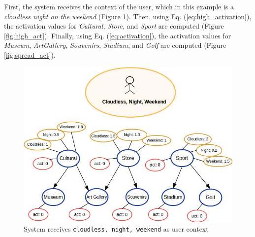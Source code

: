 \vspace{-0.2cm}
First, the system receives the context of the user, which in this example is a {\it cloudless night on the weekend} (Figure \ref{fig:init_act}). Then, using Eq. (\ref{eq:high_activation}), the activation values for \textit{Cultural}, \textit{Store}, and \textit{Sport} are computed (Figure \ref{fig:high_act}). Finally, using Eq. (\ref{eq:activation}), the activation values for \textit{Museum}, \textit{ArtGallery}, \textit{Souvenirs}, \textit{Stadium}, and \textit{Golf} are computed (Figure \ref{fig:spread_act}).

\begin{figure}[h]
\vspace{-0.3cm}
\centering
\includegraphics[scale=0.39]{draws/initial_act.jpg}
\vspace{-0.3cm}
\caption{System receives {\tt cloudless, night, weekend} as user context}
\label{fig:init_act}
\vspace{-0.3cm}
\end{figure}


